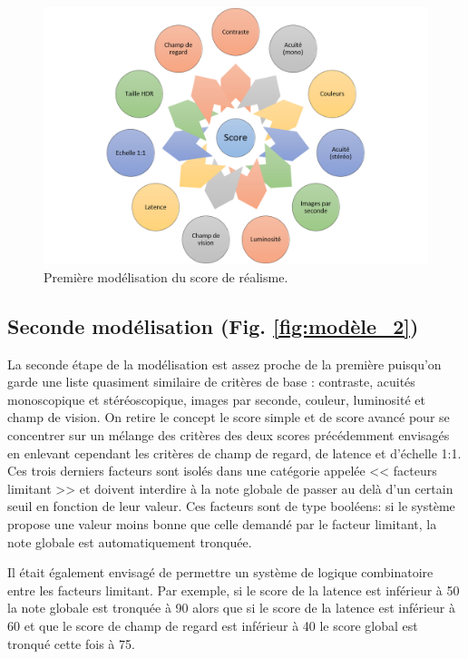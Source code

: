	\begin{figure}
		\centering
		\includegraphics[scale=.8]{Figures/Modele1}
		\caption{Première modélisation du score de réalisme.}
		\label{fig:modèle_1}
	\end{figure}
	
	\subsection{Seconde modélisation (Fig. \ref{fig:modèle_2})}
	\par La seconde étape de la modélisation est assez proche de la première puisqu'on garde une liste quasiment similaire de critères de base : contraste, acuités monoscopique et stéréoscopique, images par seconde, couleur, luminosité et champ de vision. On retire le concept le score simple et de score avancé pour se concentrer sur un mélange des critères des deux scores précédemment envisagés en enlevant cependant les critères de champ de regard, de latence et d'échelle 1:1. Ces trois derniers facteurs sont isolés dans une catégorie appelée << facteurs limitant >> et doivent interdire à la note globale de passer au delà d'un certain seuil en fonction de leur valeur. Ces facteurs sont de type booléens: si le système propose une valeur moins bonne que celle demandé par le facteur limitant, la note globale est automatiquement tronquée.
	
	\par Il était également envisagé de permettre un système de logique combinatoire entre les facteurs limitant. Par exemple, si le score de la latence est inférieur à 50 la note globale est tronquée à 90 alors que si le score de la latence est inférieur à 60 et que le score de champ de regard est inférieur à 40 le score global est tronqué cette fois à 75.
	
